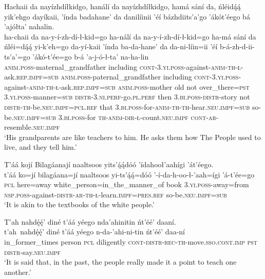 \ea\label{ex:text6-16-29}
Hachaii da nayízhdíłkidgo, hanálí da nayízhdíłkidgo, hamá sání da, ńléidą́ą́ yik’ehgo dayíkaii, ’índa badahane’ da danilíinii ’éí bázhdiits’a’go ’ákót’éego bá ’ajółta’ nahalin.\\
\gll ha-chaii	da	na-y-í-zh-dí-ł-kid=go	ha-nálí	da	na-y-í-zh-dí-ł-kid=go	ha-má	sání	da	ńléi=dą́ą́	yi-k’eh=go	da-yí-kaii	’índa	ba-da-hane’	da	da-ni-líin=ii	’éí	b-á-zh-d-ii-ts’a’=go	’ákó-t’ée=go	b-á	’a-j-ó-ł-ta’	na-ha-lin\\
     \textsc{anim}.\textsc{poss}-maternal\_grandfather	including	\textsc{cont}-3.\textsc{yi}.\textsc{poss}-against-\textsc{anim}-\textsc{th}-\textsc{ł}-ask.\textsc{rep}.\textsc{impf}=\textsc{sub}	\textsc{anim}.\textsc{poss}-paternal\_grandfather	including	\textsc{cont}-3.\textsc{yi}.\textsc{poss}-against-\textsc{anim}-\textsc{th}-\textsc{ł}-ask.\textsc{rep}.\textsc{impf}=\textsc{sub}	\textsc{anim}.\textsc{poss}-mother	old	not	over\_there=\textsc{pst}	3.\textsc{yi}.\textsc{poss}-manner=\textsc{sub}	\textsc{distr}-3.\textsc{ni}.\textsc{perf}-go.\textsc{pl}.\textsc{perf}	then	3.\textsc{bi}.\textsc{poss}-\textsc{distr}-story	not	\textsc{distr}-\textsc{th}-be.\textsc{neu}.\textsc{impf}=\textsc{pcl}.\textsc{ref}	that	3.\textsc{bi}.\textsc{poss}-for-\textsc{anim}-\textsc{th}-\textsc{th}-hear.\textsc{neu}.\textsc{impf}=\textsc{sub}	so-be.\textsc{neu}.\textsc{impf}=\textsc{sub}	3.\textsc{bi}.\textsc{poss}-for	\textsc{th}-\textsc{anim}-\textsc{dir}-\textsc{ł}-count.\textsc{neu}.\textsc{impf}	\textsc{cont}-\textsc{ar}-resemble.\textsc{neu}.\textsc{impf}\\
\glt `His grandparents are like teachers to him. He asks them how The People used to live, and they tell him.'
\z

\ea\label{ex:text6-16-30}
T’áá kojí Bilagáanají naaltsoos yits’ą́ą́dóó ’ídahooł’aahígi ’át’éego.\\
\gll t’áá	ko=jí	bilagáana=jí	naaltsoos	yi-ts’ą́ą́=dóó	’-í-da-h-oo-ł-’aah=ígi	’á-t’ée=go\\
     \textsc{pcl}	here=away	white\_person=in\_the\_manner\_of	book	3.\textsc{yi}.\textsc{poss}-away=from	\textsc{nsp}.\textsc{poss}-against-\textsc{distr}-\textsc{ar}-\textsc{th}-\textsc{ł}-learn.\textsc{impf}=\textsc{pres}.\textsc{ref}	so-be.\textsc{neu}.\textsc{impf}=\textsc{sub}\\
\glt `It is akin to the textbooks of the white people.'
\z

\ea\label{ex:text6-16-31}
T’ah nahdę́ę́’ diné t’áá yéego nda’ahinitin ńt’éé’ daaní.\\
\gll t’ah~{nahdę́ę́’}	diné	t’áá	yéego	n-da-’ahi-ni-tin	ńt’éé’	daa-ní\\
     in\_former\_times	person	\textsc{pcl}	diligently	\textsc{cont}-\textsc{distr}-\textsc{rec}-\textsc{th}-move.\textsc{sso}.\textsc{cont}.\textsc{imp}	\textsc{pst}	\textsc{distr}-say.\textsc{neu}.\textsc{impf}\\
\glt `It is said that, in the past, the people really made it a point to teach one another.'
\z

